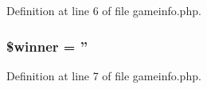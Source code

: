 Definition at line 6 of file gameinfo.\+php.

\hypertarget{templates_2install_2gameinfo_8php_ad92744668d7f5e7b2ee5b87fe8a845f2}{
\subsubsection[{\$winner}]{\setlength{\rightskip}{0pt plus 5cm}\$winner = ''}}\label{templates_2install_2gameinfo_8php_ad92744668d7f5e7b2ee5b87fe8a845f2}


Definition at line 7 of file gameinfo.\+php.

